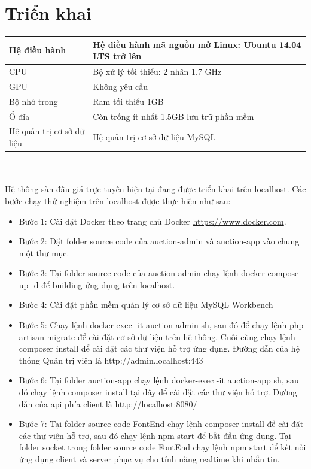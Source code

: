 \documentclass[../DoAn.tex]{subfiles}
\begin{document}
\section{Triển khai}
    \tabletail{\hline}
    \label{bang416}
    \begin{supertabular}{| p{.30\textwidth}|p{.62\textwidth}|} 
    \hline
        Hệ điều hành& Hệ điều hành mã nguồn mở Linux: Ubuntu 14.04 LTS trở lên\\\hline
        CPU& Bộ xử lý tối thiểu: 2 nhân 1.7 GHz\\\hline
        GPU& Không yêu cầu\\\hline
        Bộ nhớ trong& Ram tối thiểu 1GB \\\hline
        Ổ đĩa& Còn trống ít nhất 1.5GB lưu trữ phần mềm \\\hline
        Hệ quản trị cơ sở dữ liệu&Hệ quản trị cơ sở dữ liệu MySQL \\\hline
    \end{supertabular}\\
\\
Hệ thống sàn đấu giá trực tuyến hiện tại đang được triển khai trên localhost. Các bước chạy thử nghiệm trên localhost được thực hiện như sau: 
\begin{itemize}
    \item Bước 1: Cài đặt Docker theo trang chủ Docker \href{https://www.docker.com}{https://www.docker.com}.
    \item Bước 2: Đặt folder source code của auction-admin và auction-app vào chung một thư mục. 
    \item Bước 3: Tại folder source code của auction-admin chạy lệnh docker-compose up -d để building ứng dụng trên localhost.
    \item Bước 4: Cài đặt phần mềm quản lý cơ sở dữ liệu MySQL Workbench
    \item Bước 5: Chạy lệnh docker-exec -it auction-admin sh, sau đó để chạy lệnh php artisan migrate để cài đặt cơ sở dữ liệu trên hệ thống. Cuối cùng chạy lệnh composer install để cài đặt các thư viện hỗ trợ ứng dụng. Đường dẫn của hệ thống Quản trị viên là http://admin.localhost:443
    \item Bước 6: Tại folder auction-app chạy lệnh docker-exec -it auction-app sh, sau đó chạy lệnh composer install tại đây để cài đặt các thư viện hỗ trợ. Đường dẫn của api phía client là http://localhost:8080/
    \item Bước 7: Tại folder source code FontEnd chạy lệnh composer install để cài đặt các thư viện hỗ trợ, sau đó chạy lệnh npm start để bắt đầu ứng dụng. Tại folder socket trong folder source code FontEnd chạy lệnh npm start để kết nối ứng dụng client và server phục vụ cho tính năng realtime khi nhắn tin.
\end{itemize}
\newpage
\end{document}
